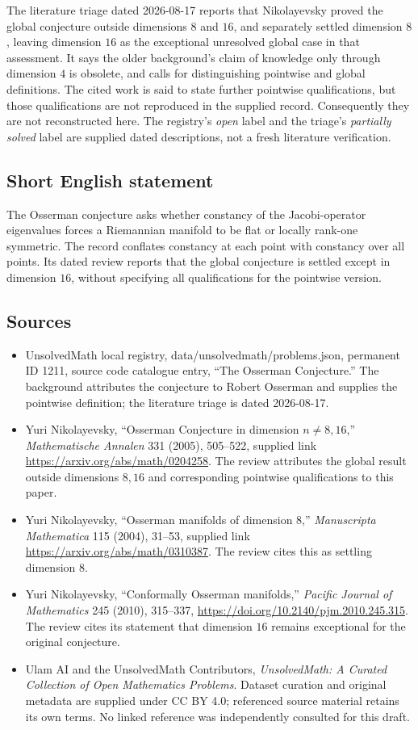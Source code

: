 \documentclass[11pt]{article}
\begin{document}
The literature triage dated 2026-08-17 reports that Nikolayevsky proved the global conjecture outside dimensions $8$ and $16$, and separately settled dimension $8$, leaving dimension $16$ as the exceptional unresolved global case in that assessment. It says the older background's claim of knowledge only through dimension $4$ is obsolete, and calls for distinguishing pointwise and global definitions. The cited work is said to state further pointwise qualifications, but those qualifications are not reproduced in the supplied record. Consequently they are not reconstructed here. The registry's \emph{open} label and the triage's \emph{partially solved} label are supplied dated descriptions, not a fresh literature verification.
\subsection{Short English statement}
The Osserman conjecture asks whether constancy of the Jacobi-operator eigenvalues forces a Riemannian manifold to be flat or locally rank-one symmetric. The record conflates constancy at each point with constancy over all points. Its dated review reports that the global conjecture is settled except in dimension $16$, without specifying all qualifications for the pointwise version.
\subsection{Sources}
\begin{itemize}
\item UnsolvedMath local registry, data/unsolvedmath/problems.json, permanent ID 1211, source code catalogue entry, ``The Osserman Conjecture.'' The background attributes the conjecture to Robert Osserman and supplies the pointwise definition; the literature triage is dated 2026-08-17.
\item Yuri Nikolayevsky, ``Osserman Conjecture in dimension $n\neq8,16$,'' \emph{Mathematische Annalen} 331 (2005), 505--522, supplied link \url{https://arxiv.org/abs/math/0204258}. The review attributes the global result outside dimensions $8,16$ and corresponding pointwise qualifications to this paper.
\item Yuri Nikolayevsky, ``Osserman manifolds of dimension 8,'' \emph{Manuscripta Mathematica} 115 (2004), 31--53, supplied link \url{https://arxiv.org/abs/math/0310387}. The review cites this as settling dimension $8$.
\item Yuri Nikolayevsky, ``Conformally Osserman manifolds,'' \emph{Pacific Journal of Mathematics} 245 (2010), 315--337, \url{https://doi.org/10.2140/pjm.2010.245.315}. The review cites its statement that dimension $16$ remains exceptional for the original conjecture.
\item Ulam AI and the UnsolvedMath Contributors, \emph{UnsolvedMath: A Curated Collection of Open Mathematics Problems}. Dataset curation and original metadata are supplied under CC BY 4.0; referenced source material retains its own terms. No linked reference was independently consulted for this draft.
\end{itemize}
\end{document}
